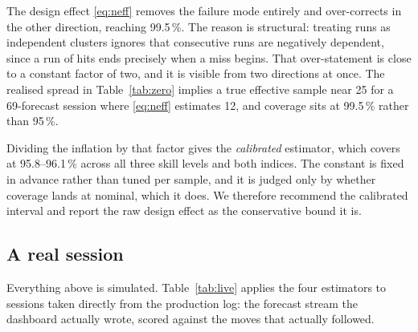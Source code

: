 \documentclass[conference]{IEEEtran}
\begin{document}
The design effect \eqref{eq:neff} removes the failure mode entirely and
over-corrects in the other direction, reaching 99.5\,\%. The reason is
structural: treating runs as independent clusters ignores that consecutive runs
are negatively dependent, since a run of hits ends precisely when a miss begins.
That over-statement is close to a constant factor of two, and it is visible from
two directions at once. The realised spread in Table~\ref{tab:zero} implies a
true effective sample near 25 for a 69-forecast session where \eqref{eq:neff}
estimates 12, and coverage sits at 99.5\,\% rather than 95\,\%.

Dividing the inflation by that factor gives the \emph{calibrated} estimator,
which covers at 95.8--96.1\,\% across all three skill levels and both indices.
The constant is fixed in advance rather than tuned per sample, and it is judged
only by whether coverage lands at nominal, which it does. We therefore recommend
the calibrated interval and report the raw design effect as the conservative
bound it is.

\subsection{A real session}

Everything above is simulated. Table~\ref{tab:live} applies the four estimators
to sessions taken directly from the production log: the forecast stream the
dashboard actually wrote, scored against the moves that actually followed.
\end{document}
